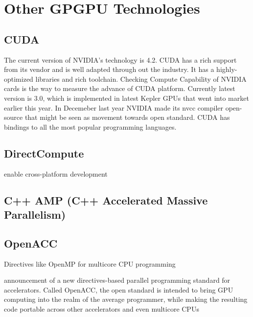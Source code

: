 
\section{Other GPGPU Technologies}
\subsection{CUDA}
The current version of NVIDIA's technology is 4.2. CUDA has a rich support from its vendor and is well adapted through out the industry. It has a highly-optimized libraries and rich toolchain. Checking Compute Capability of NVIDIA cards is the way to measure the advance of CUDA platform. Currently latest version is 3.0, which is implemented in latest Kepler GPUs that went into market earlier this year. In Decemeber last year NVIDIA made its nvcc compiler open-source that might be seen as movement towards open standard. CUDA has bindings to all the most popular programming languages.

\subsection{DirectCompute}
enable cross-platform development

\subsection{C++ AMP (C++ Accelerated Massive Parallelism)}


\subsection{OpenACC}
Directives like OpenMP for multicore CPU programming

announcement of a new directives-based parallel programming standard for accelerators.  Called OpenACC, the open standard is intended to bring GPU computing into the realm of the average programmer, while making the resulting code portable across other accelerators and even multicore CPUs

